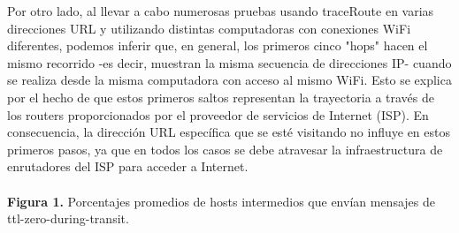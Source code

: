 \documentclass{article}
\begin{document}
        Por otro lado, al llevar a cabo numerosas pruebas usando traceRoute en varias direcciones URL y utilizando distintas computadoras con conexiones WiFi diferentes, podemos inferir que, en general, los primeros cinco "hops" hacen el mismo recorrido -es decir, muestran la misma secuencia de direcciones IP- cuando se realiza desde la misma computadora con acceso al mismo WiFi. Esto se explica por el hecho de que estos primeros saltos representan la trayectoria a través de los routers proporcionados por el proveedor de servicios de Internet (ISP). En consecuencia, la dirección URL específica que se esté visitando no influye en estos primeros pasos, ya que en todos los casos se debe atravesar la infraestructura de enrutadores del ISP para acceder a Internet.\\
        \\
        \textbf{Figura 1.} Porcentajes promedios de hosts intermedios que env\'ian mensajes de ttl-zero-during-transit.
        \begin{table}[ht]
        \end{table}
    
\end{document}
